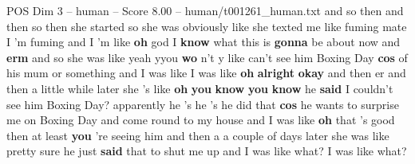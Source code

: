 \begin{textsample}{POS Dim 3 – human – Score 8.00 – human/t001261\_human.txt}  \label{ex:f3_pos_006}
and so then and then so then she started so she was obviously like she texted me like fuming mate I 'm fuming and I 'm like \textbf{oh} god I \textbf{know} what this is \textbf{gonna} be about now and \textbf{erm} and so she was like yeah yyou \textbf{wo} n't y like can't see him Boxing Day \textbf{cos} of his mum or something and I was like I was like \textbf{oh} \textbf{alright} \textbf{okay} and then er and then a little while later she 's like \textbf{oh} \textbf{you} \textbf{know} \textbf{you} \textbf{know} he \textbf{said} I couldn't see him Boxing Day? apparently he 's he 's he did that \textbf{cos} he wants to surprise me on Boxing Day and come round to my house and I was like \textbf{oh} that 's good then at least \textbf{you} 're seeing him and then a a couple of days later she was like pretty sure he just \textbf{said} that to shut me up and I was like what?
I was like what?

\end{textsample}
